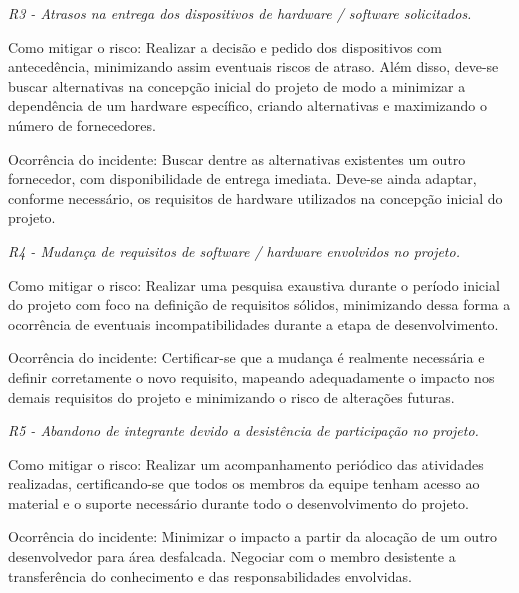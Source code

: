 {\itshape R3 -\/ Atrasos na entrega dos dispositivos de hardware / software solicitados.}


\begin{DoxyItemize}
\item Como mitigar o risco\+: Realizar a decisão e pedido dos dispositivos com antecedência, minimizando assim eventuais riscos de atraso. Além disso, deve-\/se buscar alternativas na concepção inicial do projeto de modo a minimizar a dependência de um hardware específico, criando alternativas e maximizando o número de fornecedores.
\item Ocorrência do incidente\+: Buscar dentre as alternativas existentes um outro fornecedor, com disponibilidade de entrega imediata. Deve-\/se ainda adaptar, conforme necessário, os requisitos de hardware utilizados na concepção inicial do projeto.
\end{DoxyItemize}

{\itshape R4 -\/ Mudança de requisitos de software / hardware envolvidos no projeto.}


\begin{DoxyItemize}
\item Como mitigar o risco\+: Realizar uma pesquisa exaustiva durante o período inicial do projeto com foco na definição de requisitos sólidos, minimizando dessa forma a ocorrência de eventuais incompatibilidades durante a etapa de desenvolvimento.
\item Ocorrência do incidente\+: Certificar-\/se que a mudança é realmente necessária e definir corretamente o novo requisito, mapeando adequadamente o impacto nos demais requisitos do projeto e minimizando o risco de alterações futuras.
\end{DoxyItemize}

{\itshape R5 -\/ Abandono de integrante devido a desistência de participação no projeto.}


\begin{DoxyItemize}
\item Como mitigar o risco\+: Realizar um acompanhamento periódico das atividades realizadas, certificando-\/se que todos os membros da equipe tenham acesso ao material e o suporte necessário durante todo o desenvolvimento do projeto.
\item Ocorrência do incidente\+: Minimizar o impacto a partir da alocação de um outro desenvolvedor para área desfalcada. Negociar com o membro desistente a transferência do conhecimento e das responsabilidades envolvidas.
\end{DoxyItemize}

